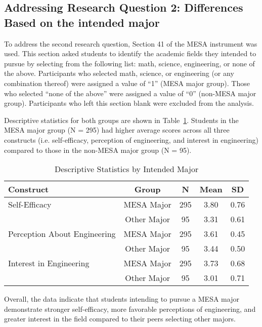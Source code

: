 \documentclass[11pt]{article}
\begin{document}
\subsection{\textbf{Addressing Research Question 2}: Differences Based on the intended major}


To address the second research question, Section 41 of the MESA instrument was used. This section asked students to identify the academic fields they intended to pursue by selecting from the following list: math, science, engineering, or none of the above. Participants who selected math, science, or engineering (or any combination thereof) were assigned a value of “1” (MESA major group). Those who selected “none of the above” were assigned a value of “0” (non-MESA major group). Participants who left this section blank were excluded from the analysis.

Descriptive statistics for both groups are shown in Table~\ref{tab:major_diff}. Students in the MESA major group (N = 295) had higher average scores across all three constructs (i.e. self-efficacy, perception of engineering, and interest in engineering) compared to those in the non-MESA major group (N = 95).


\begin{table}[h]
\centering
\begin{tabular}{lcccc}
\hline
\textbf{Construct} & \textbf{Group} & \textbf{N} & \textbf{Mean} & \textbf{SD} \\
\hline
Self-Efficacy & MESA Major & 295 & 3.80 & 0.76 \\
              & Other Major & 95 & 3.31 & 0.61 \\
\hline
Perception About Engineering & MESA Major & 295 & 3.61 & 0.45 \\
                             & Other Major & 95 & 3.44 & 0.50 \\
\hline
Interest in Engineering & MESA Major & 295 & 3.73 & 0.68 \\
                         & Other Major & 95 & 3.01 & 0.71 \\
\hline
\end{tabular}
\caption{Descriptive Statistics by Intended Major}
\label{tab:major_diff}
\end{table}

Overall, the data indicate that students intending to pursue a MESA major demonstrate stronger self-efficacy, more favorable perceptions of engineering, and greater interest in the field compared to their peers selecting other majors.
\end{document}
